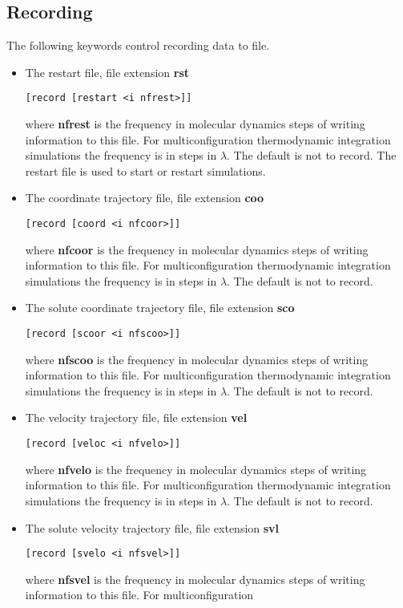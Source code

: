 \subsection{Recording}
The following keywords control recording data to file.
\begin{itemize}
\item
The restart file, file extension {\bf rst}
\begin{verbatim}
[record [restart <i nfrest>]]
\end{verbatim}
where {\bf nfrest} is the frequency in molecular dynamics steps
of writing information to this file. For multiconfiguration
thermodynamic integration simulations the frequency is in
steps in $\lambda$. The default is not to record. The restart
file is used to start or restart simulations.
\item
The coordinate trajectory file, file extension {\bf coo}
\begin{verbatim}
[record [coord <i nfcoor>]]
\end{verbatim}
where {\bf nfcoor} is the frequency in molecular dynamics steps
of writing information to this file. For multiconfiguration
thermodynamic integration simulations the frequency is in
steps in $\lambda$. The default is not to record.
\item
The solute coordinate trajectory file, file extension {\bf sco}
\begin{verbatim}
[record [scoor <i nfscoo>]]
\end{verbatim}
where {\bf nfscoo} is the frequency in molecular dynamics steps
of writing information to this file. For multiconfiguration
thermodynamic integration simulations the frequency is in
steps in $\lambda$. The default is not to record.
\item
The velocity trajectory file, file extension {\bf vel}
\begin{verbatim}
[record [veloc <i nfvelo>]]
\end{verbatim}
where {\bf nfvelo} is the frequency in molecular dynamics steps
of writing information to this file. For multiconfiguration
thermodynamic integration simulations the frequency is in
steps in $\lambda$. The default is not to record.
\item
The solute velocity trajectory file, file extension {\bf svl}
\begin{verbatim}
[record [svelo <i nfsvel>]]
\end{verbatim}
where {\bf nfsvel} is the frequency in molecular dynamics steps
of writing information to this file. For multiconfiguration

\end{itemize}
